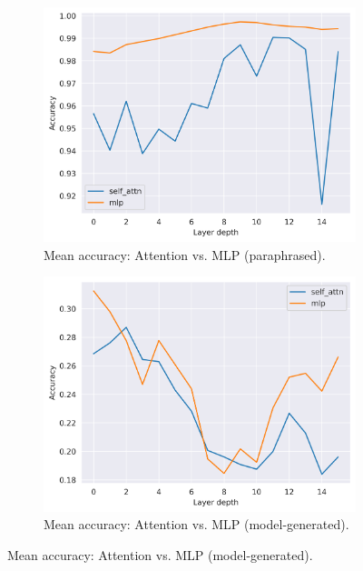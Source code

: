 \begin{figure}[htb]
    \centering
    \begin{subfigure}[h]{0.49\textwidth}
        \centering
        \includegraphics[width=\textwidth]{figures/results/paraphrased/overall_attention_vs_mlp.png}
        \caption{Mean accuracy: Attention vs. MLP (paraphrased).}                 %
        \label{fig:accuracy_over_layer_depth_attention_vs_mlp_paraphrased}
    \end{subfigure}
    \hfill
    \begin{subfigure}[h]{0.49\textwidth}
        \centering
        \includegraphics[width=\textwidth]{figures/results/model-generated/overall_attention_vs_mlp.png}
        \caption{Mean accuracy: Attention vs. MLP (model-generated).}             %

\end{subfigure}
\end{figure}
